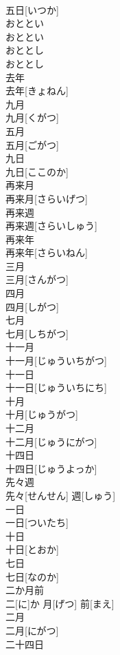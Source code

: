 \documentclass[8pt]{extreport}
\begin{document}
\begin{CJK}{UTF8}{min}
\\	五日[いつか]
\\	おととい	
\\	おととい
\\	おととし	
\\	おととし
\\	去年	
\\	去年[きょねん]
\\	九月	
\\	九月[くがつ]
\\	五月	
\\	五月[ごがつ]
\\	九日	
\\	九日[ここのか]
\\	再来月	
\\	再来月[さらいげつ]
\\	再来週	
\\	再来週[さらいしゅう]
\\	再来年	
\\	再来年[さらいねん]
\\	三月	
\\	三月[さんがつ]
\\	四月	
\\	四月[しがつ]
\\	七月	
\\	七月[しちがつ]
\\	十一月	
\\	十一月[じゅういちがつ]
\\	十一日	
\\	十一日[じゅういちにち]
\\	十月	
\\	十月[じゅうがつ]
\\	十二月	
\\	十二月[じゅうにがつ]
\\	十四日	
\\	十四日[じゅうよっか]
\\	先々週	
\\	先々[せんせん] 週[しゅう]
\\	一日	
\\	一日[ついたち]
\\	十日	
\\	十日[とおか]
\\	七日	
\\	七日[なのか]
\\	二か月前	
\\	二[に]か 月[げつ] 前[まえ]
\\	二月	
\\	二月[にがつ]
\\	二十四日	

\end{CJK}
\end{document}
